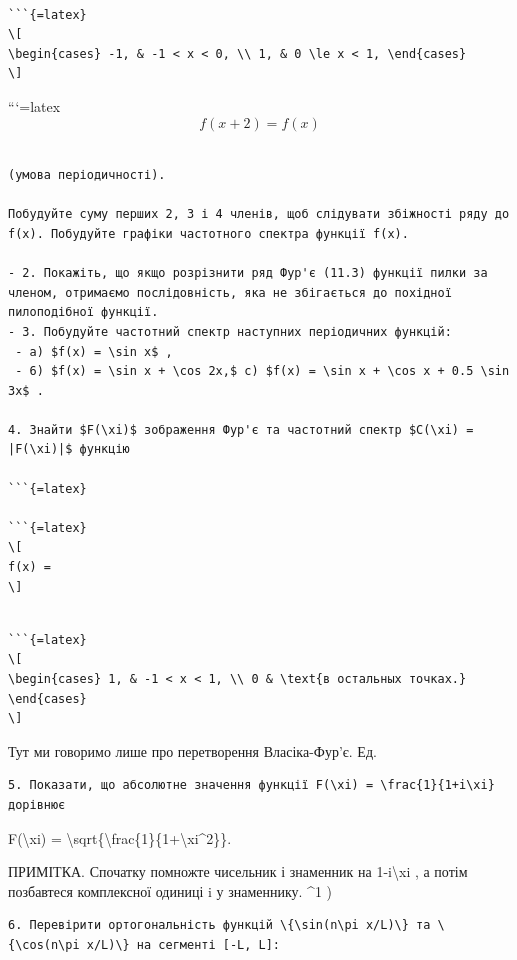 \documentclass[
]{article}
\begin{document}
\begin{verbatim}

```{=latex}
\[
\begin{cases} -1, & -1 < x < 0, \\ 1, & 0 \le x < 1, \end{cases}
\]
\end{verbatim}

```{=latex}
\[
f(x+2) = f(x)
\]

\begin{verbatim}

(умова періодичності).

Побудуйте суму перших 2, 3 і 4 членів, щоб слідувати збіжності ряду до f(x). Побудуйте графіки частотного спектра функції f(x).

- 2. Покажіть, що якщо розрізнити ряд Фур'є (11.3) функції пилки за членом, отримаємо послідовність, яка не збігається до похідної пилоподібної функції.
- 3. Побудуйте частотний спектр наступних періодичних функцій:
 - a) $f(x) = \sin x$ ,
 - 6) $f(x) = \sin x + \cos 2x,$ c) $f(x) = \sin x + \cos x + 0.5 \sin 3x$ .

4. Знайти $F(\xi)$ зображення Фур'є та частотний спектр $C(\xi) = |F(\xi)|$ функцію

```{=latex}

```{=latex}
\[
f(x) =
\]
\end{verbatim}

\begin{verbatim}

```{=latex}
\[
\begin{cases} 1, & -1 < x < 1, \\ 0 & \text{в остальных точках.} \end{cases}
\]
\end{verbatim}

Тут ми говоримо лише про перетворення Власіка-Фур'є. Ед.

\begin{verbatim}
5. Показати, що абсолютне значення функції F(\xi) = \frac{1}{1+i\xi} дорівнює
\end{verbatim}

\textbar F(\textbackslash xi)\textbar{} =
\textbackslash sqrt\{\textbackslash frac\{1\}\{1+\textbackslash xi\^{}2\}\}.

ПРИМІТКА. Спочатку помножте чисельник і знаменник на
1-i\textbackslash xi , а потім позбавтеся комплексної одиниці i у
знаменнику. \^{}1 )

\begin{verbatim}
6. Перевірити ортогональність функцій \{\sin(n\pi x/L)\} та \{\cos(n\pi x/L)\} на сегменті [-L, L]:
\end{verbatim}
\end{document}
